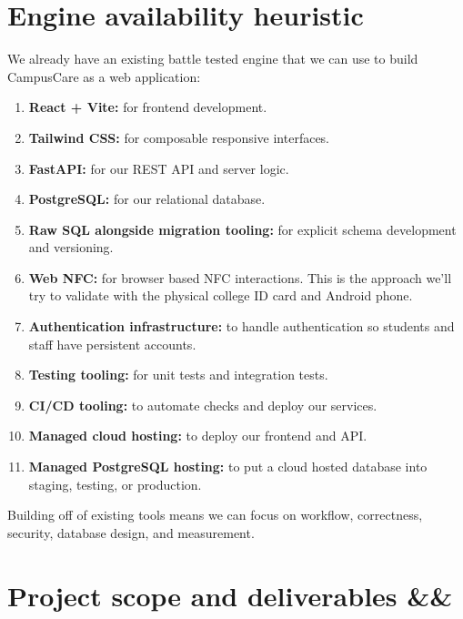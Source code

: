 \documentclass[11pt,a4paper]{article}
\newcommand{\BvrHint}[1]{%
  \ifx&#1&%
  \else
    {\normalfont\normalsize\itshape\hfill #1}%
  \fi}
\begin{document}

\section{Engine availability heuristic}

We already have an existing battle tested engine that we can use to build CampusCare as a web application:

\begin{enumerate}
    \item \textbf{React + Vite:} for frontend development.
    \item \textbf{Tailwind CSS:} for composable responsive interfaces.
    \item \textbf{FastAPI:} for our REST API and server logic.
    \item \textbf{PostgreSQL:} for our relational database.
    \item \textbf{Raw SQL alongside migration tooling:} for explicit schema development and versioning.
    \item \textbf{Web NFC:} for browser based NFC interactions. This is the approach we'll try to validate with the physical college ID card and Android phone.
    \item \textbf{Authentication infrastructure:} to handle authentication so students and staff have persistent accounts.
    \item \textbf{Testing tooling:} for unit tests and integration tests.
    \item \textbf{CI/CD tooling:} to automate checks and deploy our services.
    \item \textbf{Managed cloud hosting:} to deploy our frontend and API.
    \item \textbf{Managed PostgreSQL hosting:} to put a cloud hosted database into staging, testing, or production.
\end{enumerate}

Building off of existing tools means we can focus on workflow, correctness, security, database design, and measurement.


\section{Project scope and deliverables \BvrHint{}}
\end{document}

